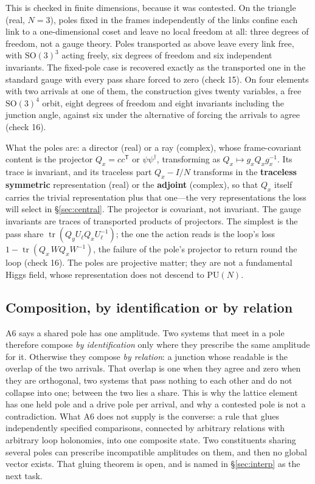 \documentclass[11pt,a4paper]{article}
\theoremstyle{plain}
\theoremstyle{definition}
\theoremstyle{remark}
\newcommand{\tr}{\operatorname{tr}}
\newcommand{\SO}{\mathrm{SO}}
\newcommand{\PU}{\mathrm{PU}}
\begin{document}
This is checked in finite dimensions, because it was contested. On the triangle (real, $N=3$), poles fixed in the frames independently of the links confine each link to a one-dimensional coset and leave no local freedom at all: three degrees of freedom, not a gauge theory. Poles transported as above leave every link free, with $\SO(3)^3$ acting freely, six degrees of freedom and six independent invariants. The fixed-pole case is recovered exactly as the transported one in the standard gauge with every pass share forced to zero (check 15). On four elements with two arrivals at one of them, the construction gives twenty variables, a free $\SO(3)^4$ orbit, eight degrees of freedom and eight invariants including the junction angle, against six under the alternative of forcing the arrivals to agree (check 16).

What the poles are: a director (real) or a ray (complex), whose frame-covariant content is the projector $Q_x=cc^{\mathsf T}$ or $\psi\psi^\dagger$, transforming as $Q_x\mapsto g_xQ_xg_x^{-1}$. Its trace is invariant, and its traceless part $Q_x-I/N$ transforms in the \textbf{traceless symmetric} representation (real) or the \textbf{adjoint} (complex), so that $Q_x$ itself carries the trivial representation plus that one---the very representations the loss will select in \S\ref{sec:central}. The projector is covariant, not invariant. The gauge invariants are traces of transported products of projectors. The simplest is the pass share $\tr(Q_yU_\ell Q_xU_\ell^{-1})$; the one the action reads is the loop's loss $1-\tr(Q_x\,WQ_xW^{-1})$, the failure of the pole's projector to return round the loop (check 16). The poles are projective matter; they are not a fundamental Higgs field, whose representation does not descend to $\PU(N)$.

\subsection{Composition, by identification or by relation}

A6 says a shared pole has one amplitude. Two systems that meet in a pole therefore compose \emph{by identification} only where they prescribe the same amplitude for it. Otherwise they compose \emph{by relation}: a junction whose readable is the overlap of the two arrivals. That overlap is one when they agree and zero when they are orthogonal, two systems that pass nothing to each other and do not collapse into one; between the two lies a share. This is why the lattice element has one held pole and a drive pole per arrival, and why a contested pole is not a contradiction. What A6 does not supply is the converse: a rule that glues independently specified comparisons, connected by arbitrary relations with arbitrary loop holonomies, into one composite state. Two constituents sharing several poles can prescribe incompatible amplitudes on them, and then no global vector exists. That gluing theorem is open, and is named in \S\ref{sec:interp} as the next task.
\end{document}
